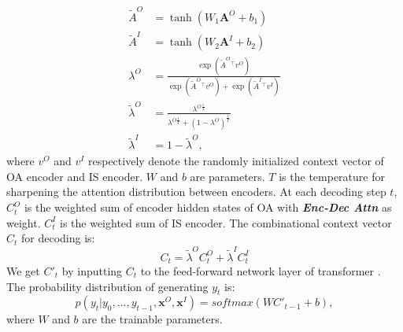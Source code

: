 \begin{align}
	\widetilde{A}^O &= \tanh(W_1\textbf{A}^O+b_1) \\
	\widetilde{A}^I &= \tanh(W_2\textbf{A}^I+b_2) \\
    \lambda^O &= \frac{\exp(\widetilde{A}^O {^\top} v^O)}{\exp(\widetilde{A}^O {^\top} v^O)+\exp(\widetilde{A}^I {^\top} v^I)}  \\
	\widetilde{\lambda}^O &=\frac{ \lambda^{O\frac{1}{T}}}{\lambda^{O\frac{1}{T}}+(1-\lambda^O)^{\frac{1}{T}}}
	\label{eq:T}  \\
	\widetilde{\lambda}^I &=1-\widetilde{\lambda}^O,
\end{align}
where $v^O$ and $v^I$ respectively denote the randomly initialized context vector of OA encoder and IS encoder.
$W$ and $b$ are parameters. $T$ is the temperature for sharpening the attention distribution between encoders.
At each decoding step $t$, 
$C_t^O$ is the weighted sum of encoder hidden states of OA with \textbf{{\em Enc-Dec Attn}} as weight. 
$C_t^I$ is the weighted sum of IS encoder.
The combinational context vector $C_t$ for decoding is:
\begin{equation}
	C_t = \widetilde{\lambda}^O C_t^O +  \widetilde{\lambda}^I C_t^I
\end{equation}
We get $C'_t$ by inputting $C_t$ to the feed-forward network layer of transformer \cite{Transformer17}.
The probability distribution of generating $y_t$ is:
\begin{equation}
p(y_t|y_0,...,y_{t-1}, \textbf{x}^O,\textbf{x}^I)=softmax(WC'_{t-1}+b),
\end{equation}
where $W$ and $b$ are the trainable parameters.


